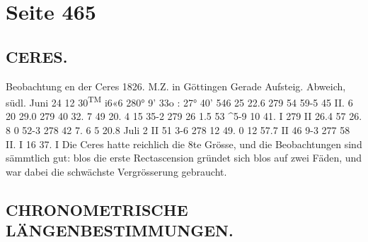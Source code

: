 \documentclass[10pt,a4paper]{article}
\begin{document}
\newpage
\section*{Seite 465}

\subsection*{CERES.}

Beobachtung en  der  Ceres  1826.
M.Z. in  Göttingen Gerade  Aufsteig.
Abweich,  südl.
Juni  24
12\glqq{}
30\textsuperscript{TM}  i6«6
280°     9'    33\glqq{}o :
27°
40'    54\glqq{}6
25     22.6
279     54     59-5
45      II.  6
20     29.0
279     40    32. 7
49     20. 4
15     35-2
279     26       1.5
53     \textasciicircum{}5-9
10     41. I
279     II     26.4
57     26.  8
0     52-3
278     42       7. 6
5     20.8
Juli      2
II
51       3-6
278     12     49. 0
12     57.7
II
46       9-3
277     58     II. I
16     37.  I
Die  Ceres  hatte  reichlich  die  8te  Grösse,  und  die  Beobachtungen  sind  sämmtlich  gut:  blos  die  erste
Rectascension  gründet  sich  blos  auf  zwei  Fäden,  und  war  dabei  die  schwächste  Vergrösserung  gebraucht.
\subsection*{CHRONOMETRISCHE  LÄNGENBESTIMMUNGEN.}
\end{document}
